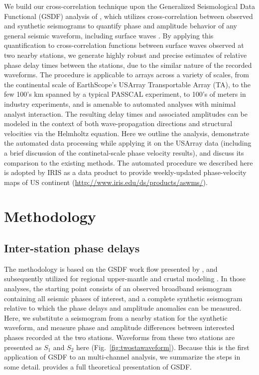 
We build our cross-correlation technique upon the Generalized Seismological Data Functional (GSDF) analysis of \citet{Gee:1992ww}, which utilizes cross-correlation between observed and synthetic seismograms to quantify phase and amplitude behavior of any general seismic waveform, including surface waves \citep{Gaherty:1995cl,Gaherty:1996uf,Gaherty:2004is,Chen:2007ho,Chen:2007it}. By applying this quantification to cross-correlation functions between surface waves observed at two nearby stations, we generate highly robust and precise estimates of relative phase delay times between the stations, due to the similar nature of the recorded waveforms.  The procedure is applicable to arrays across a variety of scales, from the continental scale of EarthScope's USArray Transportable Array (TA), to the few 100's km spanned by a typical PASSCAL experiment, to 100's of meters in industry experiments, and is amenable to automated analyses with minimal analyst interaction.  The resulting delay times and associated amplitudes can be modeled in the context of both wave-propagation directions and structural velocities via the Helmholtz equation. Here we outline the analysis, demonstrate the automated data processing while applying it on the USArray data (including a brief discussion of the continetal-scale phase velocity results), and discuss its comparison to the existing methods.
The automated procedure we described here is adopted by IRIS as a data product to provide weekly-updated phase-velocity maps of US continent (\url{http://www.iris.edu/ds/products/aswms/}).

\section{Methodology}
\subsection{Inter-station phase delays}
\label{sec:gsdf}

The methodology is based on the GSDF work flow presented by \citet{Gee:1992ww}, and subsequently utilized for regional upper-mantle and crustal modeling \citep[e.g.,][]{Gaherty:1995cl,Gaherty:1996uf,Gaherty:2001hm,Gaherty:2004is,Chen:2007it,Gaherty:2007cc}. In those analyses, the starting point consists of an observed broadband seismogram containing all seismic phases of interest, and a complete synthetic seismogram relative to which the phase delays and amplitude anomalies can be measured.  Here, we substitute a seismogram from a nearby station for the synthetic waveform, and measure phase and amplitude differences between interested phases recorded at the two stations. Waveforms from these two stations are presented as $S_1$ and $S_2$ here (Fig.~\ref{fig:twostawaveform}). Because this is the first application of GSDF to an multi-channel analysis, we summarize the steps in some detail. \citet{Gee:1992ww} provides a full theoretical presentation of GSDF. 

